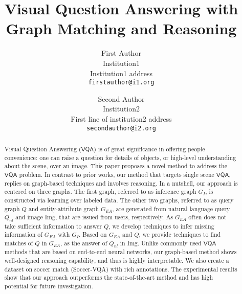 \documentclass[10pt,twocolumn,letterpaper]{article}
\newcommand{\kw}[1]{{\ensuremath {\mathsf{#1}}}\xspace}
\newcommand{\vqa}{\kw{VQA}}
\newcommand{\nlq}{Q_{nl}}
\newcommand{\eag}{G_{EA}}
\begin{document}
\title{Visual Question Answering with Graph Matching and Reasoning}

\author{First Author\\
Institution1\\
Institution1 address\\
{\tt\small firstauthor@i1.org}
\and
Second Author\\
Institution2\\
First line of institution2 address\\
{\tt\small secondauthor@i2.org}
}

\maketitle


\begin{abstract}
Visual Question Answering (\vqa) is of great significance in offering people convenience: one can raise a question for details of objects, or high-level understanding about the scene, over an image. 
This paper proposes a novel method to address the \vqa problem. In contrast to prior works, our method that targets single scene \vqa, replies on graph-based techniques and involves reasoning. In a nutshell, our approach is centered on three graphs. The first graph, referred to as inference graph $G_I$, is constructed via learning over labeled data. The other two graphs, referred to as query graph $Q$ and entity-attribute graph $\eag$, are generated from natural language query $\nlq$ and image {\cal I}mg, that are issued from users, respectively. As $\eag$ often does not take sufficient information to answer $Q$, we develop techniques to infer missing information of $\eag$ with $G_I$. Based on $\eag$ and $Q$, we provide techniques to find matches of $Q$ in $\eag$, as the answer of $\nlq$ in {\cal I}mg. Unlike commonly used 
\vqa methods that are based on end-to-end neural networks, our graph-based method shows well-designed reasoning capability, and thus is highly interpretable. We also create a dataset on soccer match (Soccer-VQA) with rich annotations. The experimental results show that our approach outperforms the state-of-the-art method and has high potential for future investigation.
\end{abstract}
















{\small


}
\end{document}
